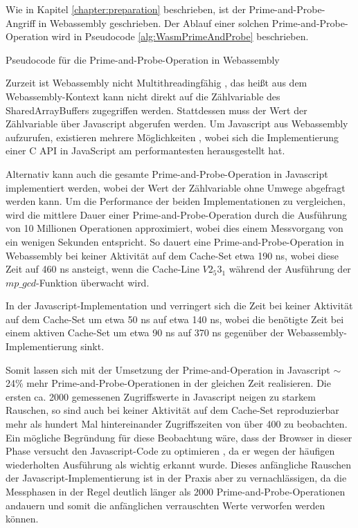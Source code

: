 Wie in Kapitel \ref{chapter:preparation} beschrieben, ist der Prime-and-Probe-Angriff in Webassembly geschrieben.
Der Ablauf einer solchen Prime-and-Probe-Operation wird in Pseudocode \ref{alg:WasmPrimeAndProbe} beschrieben.

\begin{algorithm}[h]
\DontPrintSemicolon
\caption{Pseudocode für die Prime-and-Probe-Operation in Webassembly}
\label{alg:WasmPrimeAndProbe}

\end{algorithm}

Zurzeit ist Webassembly nicht Multithreadingfähig \cite{WebassemblyThreads}, das heißt aus dem Webassembly-Kontext kann nicht direkt auf die Zählvariable des SharedArrayBuffers zugegriffen werden.
Stattdessen muss der Wert der Zählvariable über Javascript abgerufen werden.
Um Javascript aus Webassembly aufzurufen, existieren mehrere Möglichkeiten \cite{CallJavaScriptFromWasm}, wobei sich die Implementierung einer C API in JavaScript am performantesten herausgestellt hat.

Alternativ kann auch die gesamte Prime-and-Probe-Operation in Javascript implementiert werden, wobei der Wert der Zählvariable ohne Umwege abgefragt werden kann.
Um die Performance der beiden Implementationen zu vergleichen, wird die mittlere Dauer einer Prime-and-Probe-Operation durch die Ausführung von 10 Millionen Operationen approximiert, wobei dies einem Messvorgang von ein wenigen Sekunden entspricht.
So dauert eine Prime-and-Probe-Operation in Webassembly bei keiner Aktivität auf dem Cache-Set etwa 190 ns, wobei diese Zeit auf 460 ns ansteigt, wenn die Cache-Line $V2_5 3_1$ während der Ausführung der $mp\_gcd$-Funktion überwacht wird.

In der Javascript-Implementation und verringert sich die Zeit bei keiner Aktivität auf dem Cache-Set um etwa 50 ns auf etwa 140 ns, wobei die benötigte Zeit bei einem aktiven Cache-Set um etwa 90 ns auf 370 ns gegenüber der Webassembly-Implementierung sinkt.

Somit lassen sich mit der Umsetzung der Prime-and-Operation in Javascript $\sim$ 24\% mehr Prime-and-Probe-Operationen in der gleichen Zeit realisieren.
Die ersten ca. 2000 gemessenen Zugriffswerte in Javascript neigen zu starkem Rauschen, so sind auch bei keiner Aktivität auf dem Cache-Set reproduzierbar mehr als hundert Mal hintereinander Zugriffszeiten von über 400 zu beobachten.
Ein mögliche Begründung für diese Beobachtung wäre, dass der Browser in dieser Phase versucht den Javascript-Code zu optimieren \cite{GoogleTurboFan}, da er wegen der häufigen wiederholten Ausführung als wichtig erkannt wurde.
Dieses anfängliche Rauschen der Javascript-Implementierung ist in der Praxis aber zu vernachlässigen, da die Messphasen in der Regel deutlich länger als 2000 Prime-and-Probe-Operationen andauern und somit die anfänglichen verrauschten Werte verworfen werden können.

